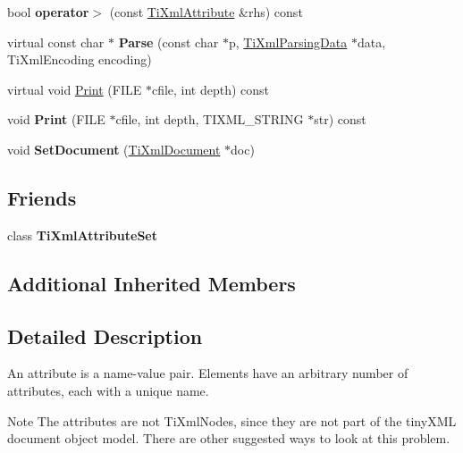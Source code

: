\begin{DoxyCompactItemize}
\item 
\hypertarget{class_ti_xml_attribute_a697c2dde7ac60fccaa7049cee906eb3e}{}\label{class_ti_xml_attribute_a697c2dde7ac60fccaa7049cee906eb3e} 
bool {\bfseries operator$>$} (const \hyperlink{class_ti_xml_attribute}{Ti\+Xml\+Attribute} \&rhs) const
\item 
\hypertarget{class_ti_xml_attribute_ad62774421b814894b995af3b5d231dda}{}\label{class_ti_xml_attribute_ad62774421b814894b995af3b5d231dda} 
virtual const char $\ast$ {\bfseries Parse} (const char $\ast$p, \hyperlink{class_ti_xml_parsing_data}{Ti\+Xml\+Parsing\+Data} $\ast$data, Ti\+Xml\+Encoding encoding)
\item 
virtual void \hyperlink{class_ti_xml_attribute_a68ae373e03b9c35be4c9d0c3c233b894}{Print} (F\+I\+LE $\ast$cfile, int depth) const
\item 
\hypertarget{class_ti_xml_attribute_a5c8f72a7d1a49972434d45f4c2889e0e}{}\label{class_ti_xml_attribute_a5c8f72a7d1a49972434d45f4c2889e0e} 
void {\bfseries Print} (F\+I\+LE $\ast$cfile, int depth, T\+I\+X\+M\+L\+\_\+\+S\+T\+R\+I\+NG $\ast$str) const
\item 
\hypertarget{class_ti_xml_attribute_ac12a94d4548302afb12f488ba101f7d1}{}\label{class_ti_xml_attribute_ac12a94d4548302afb12f488ba101f7d1} 
void {\bfseries Set\+Document} (\hyperlink{class_ti_xml_document}{Ti\+Xml\+Document} $\ast$doc)
\end{DoxyCompactItemize}
\subsection*{Friends}
\begin{DoxyCompactItemize}
\item 
\hypertarget{class_ti_xml_attribute_a35a7b7f89f708527677d5078d41ce0bf}{}\label{class_ti_xml_attribute_a35a7b7f89f708527677d5078d41ce0bf} 
class {\bfseries Ti\+Xml\+Attribute\+Set}
\end{DoxyCompactItemize}
\subsection*{Additional Inherited Members}


\subsection{Detailed Description}
An attribute is a name-\/value pair. Elements have an arbitrary number of attributes, each with a unique name.

\begin{DoxyNote}{Note}
The attributes are not Ti\+Xml\+Nodes, since they are not part of the tiny\+X\+ML document object model. There are other suggested ways to look at this problem. 
\end{DoxyNote}


